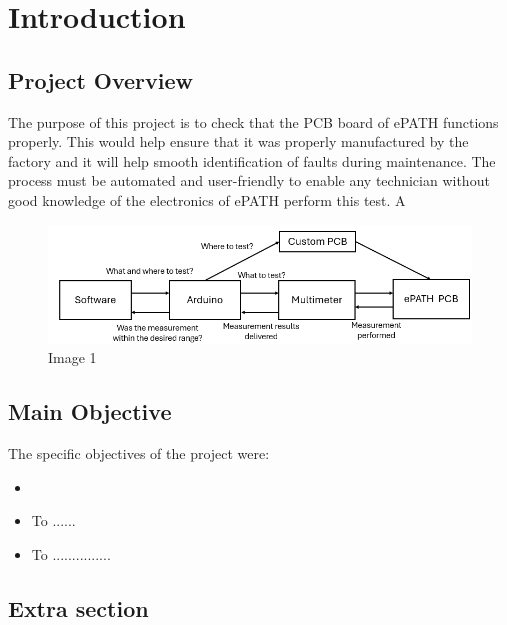 \section{Introduction}
\subsection{Project Overview}
The purpose of this project is to check that the PCB board of ePATH functions properly. This would help ensure that it was properly manufactured by the factory and it will help smooth identification of faults during maintenance. The process must be automated and user-friendly to enable any technician without good knowledge of the electronics of ePATH perform this test. A


\begin{figure}[H]
          \centering
          \includegraphics[width=1\linewidth]{img/General end goal diagram.png}
          \caption{Image 1}
          \label{fig:1}
    \end{figure}

\subsection{Main Objective}
The specific objectives of the project were: 
\begin{itemize}
\item 
\item To ...... 
\item To ...............
\end{itemize}

\subsection{Extra section}
\lipsum[1]